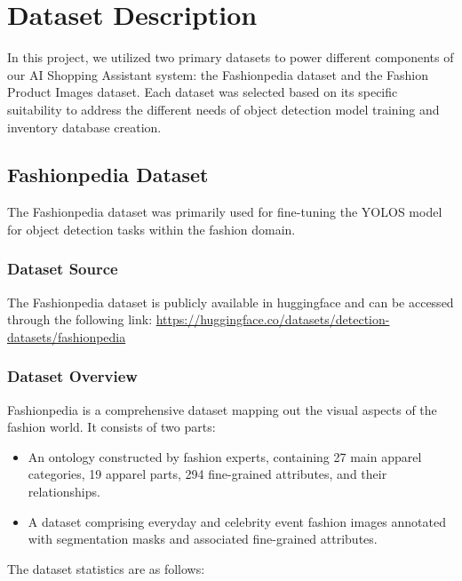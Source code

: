 \chapter{Dataset Description}
\label{chap:dataset_description}


In this project, we utilized two primary datasets to power different components of our AI Shopping Assistant system: the Fashionpedia dataset and the Fashion Product Images dataset. Each dataset was selected based on its specific suitability to address the different needs of object detection model training and inventory database creation.

\section{Fashionpedia Dataset}

The Fashionpedia dataset was primarily used for fine-tuning the YOLOS model for object detection tasks within the fashion domain.

\subsection{Dataset Source}

The Fashionpedia dataset is publicly available in huggingface and can be accessed through the following link: \href{https://huggingface.co/datasets/detection-datasets/fashionpedia}{https://huggingface.co/datasets/detection-datasets/fashionpedia}

\subsection{Dataset Overview}

Fashionpedia is a comprehensive dataset mapping out the visual aspects of the fashion world. It consists of two parts:

\vspace{-1.25em}
\begin{itemize}
    \setlength\itemsep{-1.5em}
    \item An ontology constructed by fashion experts, containing 27 main apparel categories, 19 apparel parts, 294 fine-grained attributes, and their relationships.
    \item A dataset comprising everyday and celebrity event fashion images annotated with segmentation masks and associated fine-grained attributes.
\end{itemize}

The dataset statistics are as follows:

